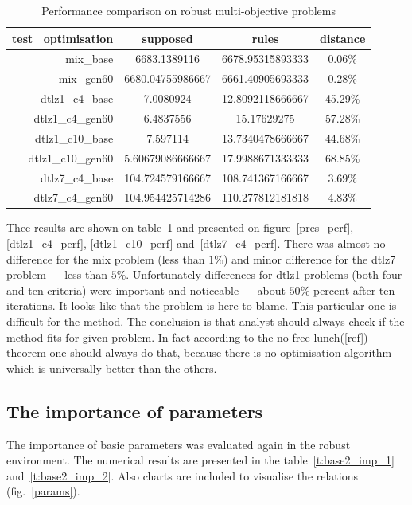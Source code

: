 \begin{table}
  \centering
  \caption{Performance comparison on robust multi-objective problems}
  \label{t:perf-comp}
  \begin{tabular}{r c c c}
    \hline
    test \ optimisation & supposed & rules & distance \\
    \hline
    \hline
    mix\_base & 6683.1389116 & 6678.95315893333 & 0.06\% \\
    mix\_gen60 & 6680.04755986667 & 6661.40905693333 & 0.28\% \\
    dtlz1\_c4\_base & 7.0080924 & 12.8092118666667 & 45.29\% \\
    dtlz1\_c4\_gen60 & 6.4837556 & 15.17629275 & 57.28\% \\
    dtlz1\_c10\_base & 7.597114 & 13.7340478666667 & 44.68\% \\
    dtlz1\_c10\_gen60 & 5.60679086666667 & 17.9988671333333 & 68.85\% \\
    dtlz7\_c4\_base & 104.724579166667 & 108.741367166667 & 3.69\% \\
    dtlz7\_c4\_gen60 & 104.954425714286 & 110.277812181818 & 4.83\% \\
    \hline
  \end{tabular}
\end{table}

Thee results are shown on table~\ref{t:perf-comp} and presented on
figure~\ref{pres_perf}, \ref{dtlz1_c4_perf}, \ref{dtlz1_c10_perf}
and~\ref{dtlz7_c4_perf}. There was almost no difference for the mix problem
(less than $1\%$) and minor difference for the dtlz7 problem --- less than
$5\%$. Unfortunately differences for dtlz1 problems (both four- and
ten-criteria) were important and noticeable --- about $50\%$ percent after ten
iterations. It looks like that the problem is here to blame. This particular
one is difficult for the method. The conclusion is that analyst should always
check if the method fits for given problem. In fact according to the
no-free-lunch([ref]) theorem one should always do that, because there is no
optimisation algorithm which is universally better than the others.

\clearpage{}

\subsection{The importance of parameters}

The importance of basic parameters was evaluated again in the robust
environment. The numerical results are presented in the
table~\ref{t:base2_imp_1} and~\ref{t:base2_imp_2}. Also charts are included to
visualise the relations (fig.~\ref{params}).

